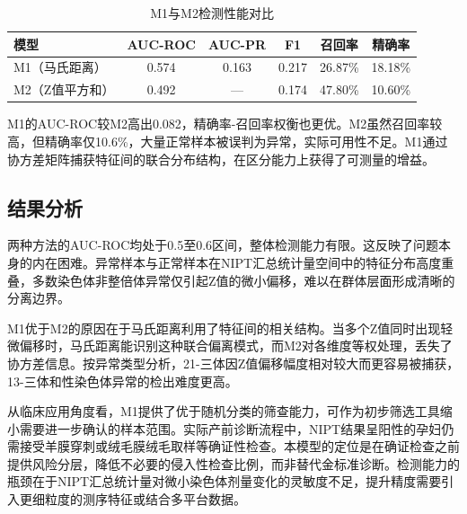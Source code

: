 \begin{table}[H]
  \centering
  \caption{M1与M2检测性能对比}\label{tab:q4-compare}
  \begin{tabular}{lccccc}
    \toprule
    模型 & AUC-ROC & AUC-PR & F1 & 召回率 & 精确率 \\
    \midrule
    M1（马氏距离） & 0.574 & 0.163 & 0.217 & 26.87\% & 18.18\% \\
    M2（Z值平方和） & 0.492 & --- & 0.174 & 47.80\% & 10.60\% \\
    \bottomrule
  \end{tabular}
\end{table}

M1的AUC-ROC较M2高出0.082，精确率-召回率权衡也更优。M2虽然召回率较高，但精确率仅10.6\%，大量正常样本被误判为异常，实际可用性不足。M1通过协方差矩阵捕获特征间的联合分布结构，在区分能力上获得了可测量的增益。

\subsection{结果分析}

两种方法的AUC-ROC均处于0.5至0.6区间，整体检测能力有限。这反映了问题本身的内在困难。异常样本与正常样本在NIPT汇总统计量空间中的特征分布高度重叠，多数染色体非整倍体异常仅引起Z值的微小偏移，难以在群体层面形成清晰的分离边界。

M1优于M2的原因在于马氏距离利用了特征间的相关结构。当多个Z值同时出现轻微偏移时，马氏距离能识别这种联合偏离模式，而M2对各维度等权处理，丢失了协方差信息。按异常类型分析，21-三体因Z值偏移幅度相对较大而更容易被捕获，13-三体和性染色体异常的检出难度更高。

从临床应用角度看，M1提供了优于随机分类的筛查能力，可作为初步筛选工具缩小需要进一步确认的样本范围。实际产前诊断流程中，NIPT结果呈阳性的孕妇仍需接受羊膜穿刺或绒毛膜绒毛取样等确证性检查。本模型的定位是在确证检查之前提供风险分层，降低不必要的侵入性检查比例，而非替代金标准诊断。检测能力的瓶颈在于NIPT汇总统计量对微小染色体剂量变化的灵敏度不足，提升精度需要引入更细粒度的测序特征或结合多平台数据。
